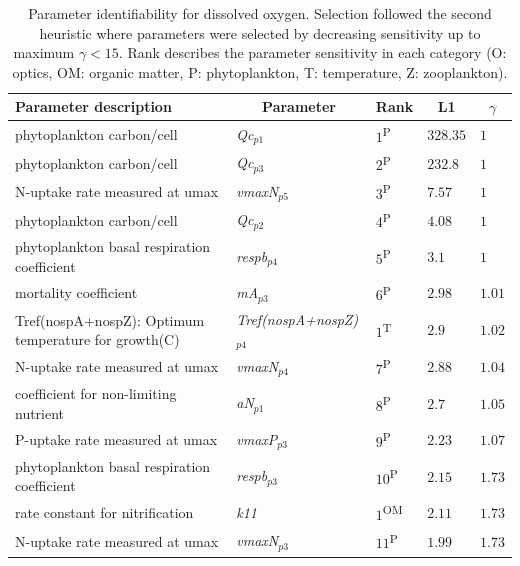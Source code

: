 \documentclass[letterpaper,12pt,oneside]{article}\usepackage[]{graphicx}\usepackage[]{color}
\begin{document}
\begin{table}[!tbp]
{\footnotesize
\caption{Parameter identifiability for dissolved oxygen.  Selection followed the second heuristic where parameters were selected by decreasing sensitivity up to maximum $\gamma < 15$.  Rank describes the parameter sensitivity in each category (O: optics, OM: organic matter, P: phytoplankton, T: temperature, Z: zooplankton).\label{tab:identall1}} 
\begin{center}
\begin{tabular}{lllll}
\hline\hline
\multicolumn{1}{l}{Parameter description}&\multicolumn{1}{c}{Parameter}&\multicolumn{1}{c}{Rank}&\multicolumn{1}{c}{L1}&\multicolumn{1}{c}{$\gamma$}\tabularnewline
\hline
\scriptsize{phytoplankton carbon/cell}&\scriptsize{\textit{Qc$_{p1}$}}&$1$\textsuperscript{P}&$328.35$&$1$\tabularnewline
\scriptsize{phytoplankton carbon/cell}&\scriptsize{\textit{Qc$_{p3}$}}&$2$\textsuperscript{P}&$232.8$&$1$\tabularnewline
\scriptsize{N-uptake rate measured at umax}&\scriptsize{\textit{vmaxN$_{p5}$}}&$3$\textsuperscript{P}&$7.57$&$1$\tabularnewline
\scriptsize{phytoplankton carbon/cell}&\scriptsize{\textit{Qc$_{p2}$}}&$4$\textsuperscript{P}&$4.08$&$1$\tabularnewline
\scriptsize{phytoplankton basal respiration coefficient}&\scriptsize{\textit{respb$_{p4}$}}&$5$\textsuperscript{P}&$3.1$&$1$\tabularnewline
\scriptsize{mortality coefficient}&\scriptsize{\textit{mA$_{p3}$}}&$6$\textsuperscript{P}&$2.98$&$1.01$\tabularnewline
\scriptsize{Tref(nospA+nospZ): Optimum temperature for growth(C)}&\scriptsize{\textit{Tref(nospA+nospZ)$_{p4}$}}&$1$\textsuperscript{T}&$2.9$&$1.02$\tabularnewline
\scriptsize{N-uptake rate measured at umax}&\scriptsize{\textit{vmaxN$_{p4}$}}&$7$\textsuperscript{P}&$2.88$&$1.04$\tabularnewline
\scriptsize{coefficient for non-limiting nutrient}&\scriptsize{\textit{aN$_{p1}$}}&$8$\textsuperscript{P}&$2.7$&$1.05$\tabularnewline
\scriptsize{P-uptake rate measured at umax}&\scriptsize{\textit{vmaxP$_{p3}$}}&$9$\textsuperscript{P}&$2.23$&$1.07$\tabularnewline
\scriptsize{phytoplankton basal respiration coefficient}&\scriptsize{\textit{respb$_{p3}$}}&$10$\textsuperscript{P}&$2.15$&$1.73$\tabularnewline
\scriptsize{rate constant for nitrification}&\scriptsize{\textit{k11}}&$1$\textsuperscript{OM}&$2.11$&$1.73$\tabularnewline
\scriptsize{N-uptake rate measured at umax}&\scriptsize{\textit{vmaxN$_{p3}$}}&$11$\textsuperscript{P}&$1.99$&$1.73$\tabularnewline

\end{tabular}
\end{center}}
\end{table}
\end{document}
